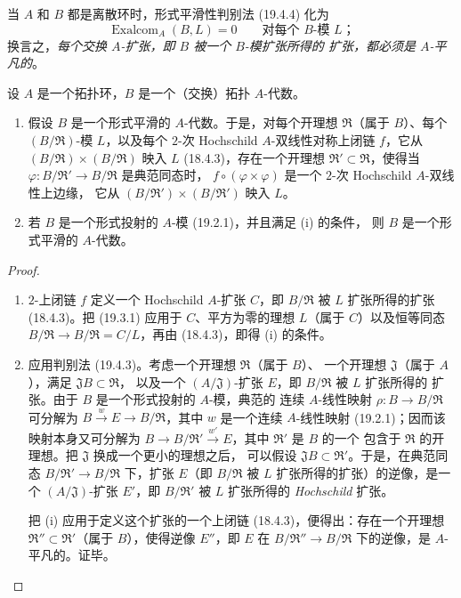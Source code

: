 当 $A$ 和 $B$ 都是离散环时，形式平滑性判别法 (19.4.4) 化为
\begin{equation}
\tag{19.4.4.1}
\label{0.19.4.4.1-fr}
\operatorname{Exalcom}_A(B,L)=0\qquad\text{对每个 $B$-模 $L$}；
\end{equation}
换言之，\emph{每个交换 $A$-扩张，即 $B$ 被一个 $B$-模扩张所得的
扩张，都必须是 $A$-平凡的}。

\begin{corollary}[19.4.5]
\label{0.19.4.5-fr}
设 $A$ 是一个拓扑环，$B$ 是一个（交换）拓扑 $A$-代数。
\begin{enumerate}
  \item[(i)] 假设 $B$ 是一个形式平滑的 $A$-代数。于是，对每个开理想
  $\mathfrak R$（属于 $B$）、每个 $(B/\mathfrak R)$-模 $L$，以及每个
  $2$-次 Hochschild $A$-双线性对称上闭链 $f$，它从
  $(B/\mathfrak R)\times(B/\mathfrak R)$ 映入 $L$ (18.4.3)，存在一个开理想
  $\mathfrak R'\subset\mathfrak R$，使得当
  $\varphi:B/\mathfrak R'\to B/\mathfrak R$ 是典范同态时，
  $f\circ(\varphi\times\varphi)$ 是一个 $2$-次 Hochschild $A$-双线性上边缘，
  它从 $(B/\mathfrak R')\times(B/\mathfrak R')$ 映入 $L$。
  \item[(ii)] 若 $B$ 是一个形式投射的 $A$-模 (19.2.1)，并且满足 (i) 的条件，
  则 $B$ 是一个形式平滑的 $A$-代数。
\end{enumerate}
\end{corollary}

\begin{proof}
\begin{enumerate}
  \item[(i)] $2$-上闭链 $f$ 定义一个 Hochschild $A$-扩张 $C$，即
  $B/\mathfrak R$ 被 $L$ 扩张所得的扩张 (18.4.3)。把 (19.3.1) 应用于
  $C$、平方为零的理想 $L$（属于 $C$）以及恒等同态
  $B/\mathfrak R\to B/\mathfrak R=C/L$，再由 (18.4.3)，即得 (i) 的条件。
  \item[(ii)] 应用判别法 (19.4.3)。考虑一个开理想 $\mathfrak R$（属于 $B$）、
  一个开理想 $\mathfrak J$（属于 $A$），满足 $\mathfrak JB\subset\mathfrak R$，
  以及一个 $(A/\mathfrak J)$-扩张 $E$，即 $B/\mathfrak R$ 被 $L$ 扩张所得的
  扩张。由于 $B$ 是一个形式投射的 $A$-模，典范的
  连续 $A$-线性映射 $\rho:B\to B/\mathfrak R$ 可分解为
  $B\xrightarrow{w}E\to B/\mathfrak R$，其中 $w$ 是一个连续 $A$-线性映射
  (19.2.1)；因而该映射本身又可分解为
  $B\to B/\mathfrak R'\xrightarrow{w'}E$，其中 $\mathfrak R'$ 是 $B$ 的一个
  包含于 $\mathfrak R$ 的开理想。把 $\mathfrak J$ 换成一个更小的理想之后，
  可以假设 $\mathfrak JB\subset\mathfrak R'$。于是，在典范同态
  $B/\mathfrak R'\to B/\mathfrak R$ 下，扩张 $E$（即
  $B/\mathfrak R$ 被 $L$ 扩张所得的扩张）的逆像，是一个
  $(A/\mathfrak J)$-扩张 $E'$，即 $B/\mathfrak R'$ 被 $L$ 扩张所得的
  \emph{Hochschild} 扩张。


  把 (i) 应用于定义这个扩张的一个上闭链 (18.4.3)，便得出：存在一个开理想
  $\mathfrak R''\subset\mathfrak R'$（属于 $B$），使得逆像 $E''$，即 $E$ 在
  $B/\mathfrak R''\to B/\mathfrak R$ 下的逆像，是 $A$-平凡的。证毕。
\end{enumerate}
\end{proof}

